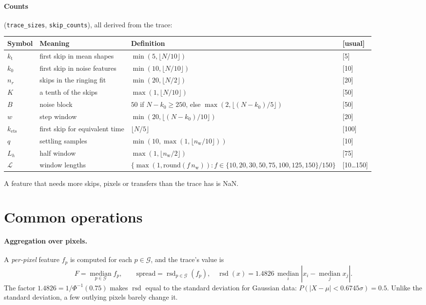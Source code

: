 \documentclass[10pt]{article}
\newcommand{\code}[1]{\texttt{#1}}
\newcommand{\med}{\operatorname*{median}}
\newcommand{\rsd}{\operatorname{rsd}}
\newcommand{\nw}{n_\text{w}}
\newcommand{\kt}{k_\text{t}}
\newcommand{\ko}{k_0}
\newcommand{\G}{\mathcal G}
\begin{document}
\paragraph{Counts} (\code{trace\_sizes}, \code{skip\_counts}), all derived from the trace:
\begin{center}
\small
\begin{tabular}{llll}
\toprule
Symbol & Meaning & Definition & [usual] \\
\midrule
$\kt$ & first skip in mean shapes & $\min(5, \lfloor N/10\rfloor)$ & [5] \\
$\ko$ & first skip in noise features & $\min(10, \lfloor N/10\rfloor)$ & [10] \\
$n_r$ & skips in the ringing fit & $\min(20, \lfloor N/2\rfloor)$ & [20] \\
$K$ & a tenth of the skips & $\max(1, \lfloor N/10\rfloor)$ & [50] \\
$B$ & noise block & $50$ if $N - \ko \ge 250$, else $\max(2, \lfloor (N-\ko)/5\rfloor)$ & [50] \\
$w$ & step window & $\min(20, \lfloor (N-\ko)/10\rfloor)$ & [20] \\
$k_\text{ets}$ & first skip for equivalent time & $\lfloor N/5\rfloor$ & [100] \\
$q$ & settling samples & $\min(10, \max(1, \lfloor\nw/10\rfloor))$ & [10] \\
$L_h$ & half window & $\max(1, \lfloor \nw/2\rfloor)$ & [75] \\
$\mathcal L$ & window lengths & $\{\max(1, \mathrm{round}(f\,\nw)) : f \in \{10,20,30,50,75,100,125,150\}/150\}$ & [10\dots150] \\
\bottomrule
\end{tabular}
\end{center}
A feature that needs more skips, pixels or transfers than the trace has is NaN.

\section{Common operations}

\paragraph{Aggregation over pixels.} A \emph{per-pixel} feature $f_p$ is computed for each $p \in \G$, and the trace's value is
\begin{equation}
F = \med_{p \in \G} f_p, \qquad \text{spread} = \rsd_{p\in\G}(f_p),\quad \rsd(x) = 1.4826\,\med_i |x_i - \med_j x_j|.
\end{equation}
The factor $1.4826 = 1/\Phi^{-1}(0.75)$ makes $\rsd$ equal to the standard deviation for Gaussian data: $P(|X - \mu| < 0.6745\sigma) = 0.5$.
Unlike the standard deviation, a few outlying pixels barely change it.
\end{document}
